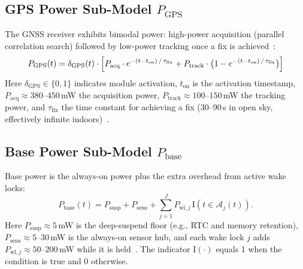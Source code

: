 \documentclass{mcmthesis}
\begin{document}
\subsection{GPS Power Sub-Model \texorpdfstring{$P_{\text{GPS}}$}{P\_GPS}}
\label{sec:gps}

The GNSS receiver exhibits bimodal power: high-power acquisition (parallel correlation search) followed by low-power tracking once a fix is achieved~\cite{ref37}:
\begin{equation}
  P_{\text{GPS}}(t) = \delta_{\text{GPS}}(t) \cdot
    \Bigl[
      P_{\text{acq}} \cdot e^{-(t - t_{\text{on}})\,/\,\tau_{\text{fix}}}
      + P_{\text{track}} \cdot \bigl(1 - e^{-(t - t_{\text{on}})\,/\,\tau_{\text{fix}}}\bigr)
    \Bigr]
  \label{eq:Pgps}
\end{equation}
Here $\delta_{\text{GPS}} \in \{0,1\}$ indicates module activation, $t_{\text{on}}$ is the activation timestamp, $P_{\text{acq}} \approx 380$--$450$\,mW the acquisition power, $P_{\text{track}} \approx 100$--$150$\,mW the tracking power, and $\tau_{\text{fix}}$ the time constant for achieving a fix (30--90\,s in open sky, effectively infinite indoors)~\cite{ref36}.

\subsection{Base Power Sub-Model \texorpdfstring{$P_{\text{base}}$}{P\_base}}
\label{sec:base}

Base power is the always-on power plus the extra overhead from active wake locks:
\begin{equation}
P_{\text{base}}(t)
= P_{\text{susp}} + P_{\text{sens}}
+ \sum_{j=1}^{J} P_{\text{wl},j}\,\mathrm{I}\!\left(t \in \mathcal{A}_j(t)\right).
\label{eq:Pbase}
\end{equation}
Here $P_{\text{susp}} \approx 5$\,mW is the deep-suspend floor (e.g., RTC and memory retention),
$P_{\text{sens}} \approx 5$--$30$\,mW is the always-on sensor hub, and each wake lock $j$ adds
$P_{\text{wl},j}\approx 50$--$200$\,mW while it is held~\cite{ref38}.
The indicator $\mathrm{I}(\cdot)$ equals 1 when the condition is true and 0 otherwise.

\end{document}
